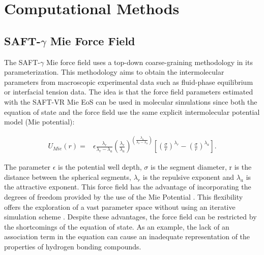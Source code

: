 \documentclass[final,12p,times,twocolumn]{elsarticle}
\begin{document}
	
	

	\section{Computational Methods}
	
	\subsection{SAFT-$\gamma$ Mie Force Field}
	
	The SAFT-$\gamma$ Mie force field uses a top-down coarse-graining methodology in its parameterization. This methodology aims to obtain the intermolecular parameters from macroscopic experimental data such as fluid-phase equilibrium or interfacial tension data. The idea is that the force field parameters estimated with the SAFT-VR Mie EoS can be used in molecular simulations since both the equation of state and the force field use the same explicit intermolecular potential model (Mie potential):
	
	\begin{equation}
	\begin{aligned}
	U_{Mie}(r) {}=& \epsilon\frac{\lambda_r}{\lambda_r - \lambda_a} \left(\frac{\lambda_r}{\lambda_a} \right)^{\left( \frac{\lambda_a}{\lambda_r - \lambda_a} \right)}  \left[ \left(\frac{\sigma}{r} \right)^{\lambda_r} - \left(\frac{\sigma}{r} \right)^{\lambda_a} \right].
	\end{aligned}
	\label{eqn:miepotential}
	\end{equation}
	
	The parameter $\epsilon$ is the potential well depth, $\sigma$ is the segment diameter, r is the distance between the spherical segments, $\lambda_r$ is the repulsive exponent and $\lambda_a$ is the attractive exponent. This force field has the advantage of incorporating the degrees of freedom provided by the use of the Mie Potential \cite{herdes2015}. This flexibility offers the exploration of a vast parameter space without using an iterative simulation scheme \cite{avendano2011}. Despite these advantages, the force field can be restricted by the shortcomings of the equation of state. As an example, the lack of an association term in the equation can cause an inadequate representation of the properties of hydrogen bonding compounds.
	
\end{document}
